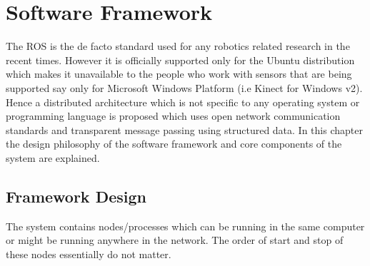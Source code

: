 
\chapter{Software Framework} %

\label{Chapter4} %

		The ROS \cite{quigley2009ros} is the de facto standard used for any robotics related research in the recent times. However it is officially supported only for the Ubuntu distribution which makes it unavailable to the people who work with sensors that are being supported say only for Microsoft Windows Platform (i.e Kinect for Windows v2). Hence a distributed architecture which is not specific to any operating system or programming language is proposed which uses open network communication standards and transparent message passing using structured data. In this chapter the design philosophy of the software framework and core components of the system are explained.
		
\section{Framework Design}		
	The system contains nodes/processes which can be running in the same computer or might be running anywhere in the network. The order of start and stop of these nodes essentially do not matter.
